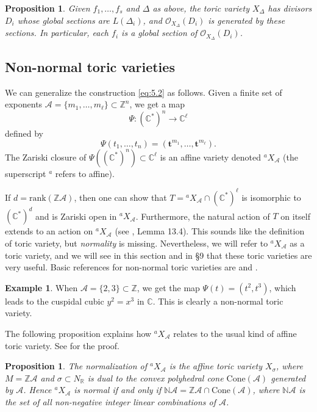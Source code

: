 \documentclass{amsart}
\theoremstyle{plain}
\newtheorem{proposition}[theorem]{Proposition}
\theoremstyle{definition}
\newtheorem*{example}{Example}
\begin{document}
\begin{proposition} Given $f_1,\dots,f_s$ and $\Delta$ as
above, the toric variety $X_\Delta$ has divisors $D_i$ whose global
sections are $L(\Delta_i)$, and $\mathcal{O}_{X_\Delta}(D_i)$ is generated
by these sections.  In particular, each $f_i$ is a global section of
$\mathcal{O}_{X_\Delta}(D_i)$.
\end{proposition}

	\subsection{Non-normal toric varieties} We can
generalize the construction \eqref{eq:5.2} as follows.  Given a finite
set of exponents $\mathcal{A} = \{m_1,\dots,m_\ell\} \subset \mathbb{Z}^n$,
we get a map
\[
\Psi : (\mathbb{C}^*)^n \longrightarrow \mathbb{C}^\ell
\]
defined by
\begin{equation}
\Psi(t_1,\dots,t_n) =
(\mathbf{t}^{m_1},\dots,\mathbf{t}^{m_\ell}).
\tag{5.5}\label{eq:5.5}
\end{equation}
The Zariski closure of $\Psi((\mathbb{C}^*)^n) \subset \mathbb{C}^\ell$ is
an affine variety denoted ${}^a\!X_{\mathcal{A}}$ (the superscript ${}^a$
refers to affine).

	If $d = \mathrm{rank}(\mathbb{Z}\mathcal{A})$, then one can show that
$T = {}^a\!X_{\mathcal{A}}\cap(\mathbb{C}^*)^\ell$ is isomorphic to $(\mathbb{C}^*)^d$ and is Zariski open in ${}^a\!X_{\mathcal{A}}$.  Furthermore, the
natural action of $T$ on itself extends to an action on
${}^a\!X_{\mathcal{A}}$ (see \cite{Stu2}, Lemma 13.4).  This sounds
like the definition of toric variety, but {\it normality\/} is
missing.  Nevertheless, we will refer to ${}^a\!X_{\mathcal{A}}$ as a
toric variety, and we will see in this section and in \S9 that these
toric varieties are very useful.  Basic references for non-normal
toric varieties are \cite{GKZ1} and \cite{Stu2}.

\begin{example} When $\mathcal{A} = \{2,3\} \subset \mathbb{Z}$, we get the
map $\Psi(t) = (t^2,t^3)$, which leads to the cuspidal cubic $y^2 =
x^3$ in $\mathbb{C}$.  This is clearly a non-normal toric variety.
\end{example}

	The following proposition explains how ${}^a\!X_{\mathcal{A}}$
relates to the usual kind of affine toric variety.  See \cite{Stu2}
for the proof.

\begin{proposition} The normalization of ${}^a\!X_{\mathcal{A}}$ is
the affine toric variety $X_\sigma$, where $M = \mathbb{Z}\mathcal{A}$ and
$\sigma \subset N_{\mathbb{R}}$ is dual to the convex polyhedral cone
$\mathrm{Cone}(\mathcal{A})$ generated by $\mathcal{A}$.  Hence
${}^a\!X_{\mathcal{A}}$ is normal if and only if $\mathbb{N}\mathcal{A} = \mathbb{Z}\mathcal{A}\cap\mathrm{Cone}(\mathcal{A})$, where $\mathbb{N}\mathcal{A}$ is the
set of all non-negative integer linear combinations of $\mathcal{A}$.
\end{proposition}
\end{document}
